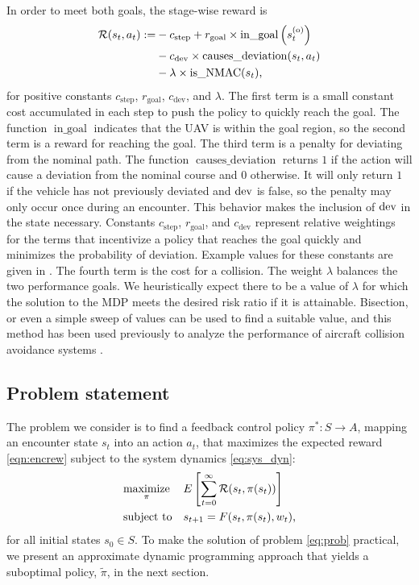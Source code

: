 In order to meet both goals, the stage-wise reward is
\begin{align}\label{eqn:rew}
    \mathcal{R}(s_t, a_t) := & - c_\text{step} + r_\text{goal} \times \operatorname{in\_goal}\left(s^{(\mathrm{o})}_t\right) \nonumber\\
             & - c_\text{dev} \times \operatorname{causes\_deviation}(s_t, a_t) \nonumber\\
             & - \lambda \times \operatorname{is\_NMAC}(s_t) \text{,}
\end{align}
for positive constants $c_\text{step}$, $r_\text{goal}$, $c_\text{dev}$,  and $ \lambda$. The first term is a small constant cost accumulated in each step to push the policy to quickly reach the goal. The function $\operatorname{in\_goal}$ indicates that the UAV is within the goal region, so the second term is a reward for reaching the goal. The third term is a penalty for deviating from the nominal path. The function $\operatorname{causes\_deviation}$ returns $1$ if the action will cause a deviation from the nominal course and $0$ otherwise. It will only return $1$ if the vehicle has not previously deviated and $\mathrm{dev }$ is false, so the penalty may only occur once during an encounter. This behavior makes the inclusion of $\mathrm{dev }$ in the state necessary. Constants $c_\text{step}$, $r_\text{goal}$, and $c_\text{dev} $ represent relative weightings for the terms that incentivize a policy that reaches the goal quickly and minimizes the probability of deviation. Example values for these constants  are given in . The fourth term is the cost for a collision. The weight $\lambda$ balances the two performance goals. We heuristically expect there to be a value of $\lambda$ for which the solution to the MDP meets the desired risk ratio if it is attainable. Bisection, or even a simple sweep of values can be used to find a suitable value, and this method has been used previously to analyze the performance of aircraft collision avoidance systems \cite{HB-DH-MJK-WSL:12,MJK-JPC:11}.

\subsection{Problem statement}
The problem we consider  is to find a feedback control policy $\pi^*: S \to A$, mapping an encounter state $s_t$ into an action $a_t$,  that maximizes the expected reward \eqref{eqn:encrew} subject to the system dynamics \eqref{eq:sys_dyn}:
\begin{equation}\label{eq:prob}
\begin{aligned}
& \underset{\pi}{\text{maximize}}
& & E \left[\sum_{t=0}^\infty \mathcal{R}(s_t, \pi(s_t))\right] \\
& \text{subject to}
& & s_{t+1} = F(s_t, \pi(s_t), w_t) \text{,}
\end{aligned}
\end{equation}
for all initial states $s_0 \in S$. To make the solution of problem \eqref{eq:prob} practical, we present an approximate dynamic programming approach that yields a suboptimal policy, $\tilde{\pi}$, in the next section.

